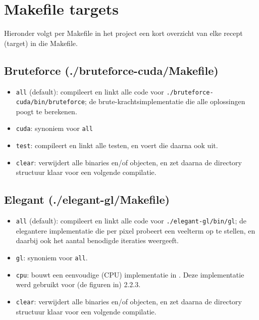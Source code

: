 \documentclass{article}
\begin{document}
\section{Makefile targets}
Hieronder volgt per Makefile in het project een kort overzicht van elke recept (target) in die Makefile.

\subsection{Bruteforce (./bruteforce-cuda/Makefile)}
\begin{itemize}
 \item \verb|all| (default): compileert en linkt alle code voor \verb|./bruteforce-cuda/bin/bruteforce|; de brute-krachtsimplementatie die alle oplossingen poogt te berekenen.
 \item \verb|cuda|: synoniem voor \verb|all|
 \item \verb|test|: compileert en linkt alle testen, en voert die daarna ook uit.
 \item \verb|clear|: verwijdert alle binaries en/of objecten, en zet daarna de directory structuur klaar voor een volgende compilatie.
\end{itemize}

\subsection{Elegant (./elegant-gl/Makefile)}
\begin{itemize}
 \item \verb|all| (default): compileert en linkt alle code voor \verb|./elegant-gl/bin/gl|; de elegantere implementatie die per pixel probeert een veelterm op te stellen, en daarbij ook het aantal benodigde iteraties weergeeft.
 \item \verb|gl|: synoniem voor \verb|all|.
 \item \verb|cpu|: bouwt een eenvoudige (CPU) implementatie in \verb||. Deze implementatie werd gebruikt voor (de figuren in) 2.2.3.
 \item \verb|clear|: verwijdert alle binaries en/of objecten, en zet daarna de directory structuur klaar voor een volgende compilatie.
\end{itemize}
\end{document}
